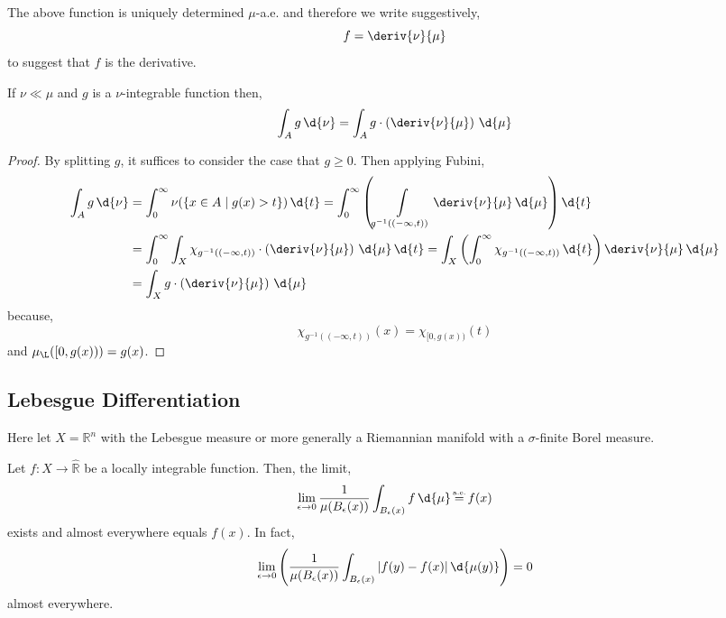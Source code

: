 \documentclass[12pt]{article}
\newcommand{\R}{\mathbb{R}}
\newcommand\eqae{\mathrel{\stackrel{\makebox[0pt]{\mbox{\normalfont\tiny a.e.}}}{=}}}
\begin{document}
\begin{rmk}
The above function is uniquely determined $\mu$-a.e. and therefore we write suggestively,
\[ f = \deriv{\nu}{\mu} \]
to suggest that $f$ is the derivative.
\end{rmk}

\begin{cor}
If $\nu \ll \mu$ and $g$ is a $\nu$-integrable function then,
\[ \int_A g \, \d{\nu} = \int_A g \cdot \left( \deriv{\nu}{\mu} \right) \, \d{\mu} \]
\end{cor}

\begin{proof}
By splitting $g$, it suffices to consider the case that $g \ge 0$. Then applying Fubini,
\begin{align*}
\int_A g \, \d{\nu} & = \int_0^{\infty} \nu(\{ x \in A \mid g(x) > t \}) \, \d{t} = \int_0^{\infty} \left( \int\limits_{g^{-1}((-\infty, t))} \deriv{\nu}{\mu} \, \d{\mu} \right) \d{t} 
\\
& = \int_0^{\infty} \int_X \chi_{g^{-1}((-\infty, t))} \cdot \left( \deriv{\nu}{\mu} \right) \, \d{\mu} \, \d{t} = \int_X \left( \int_0^\infty \chi_{g^{-1}((-\infty, t))} \, \d{t} \right) \deriv{\nu}{\mu} \, \d{\mu}
\\
& = \int_X g  \cdot \left( \deriv{\nu}{\mu} \right) \, \d{\mu} 
\end{align*}
because,
\[ \chi_{g^{-1}((-\infty, t))}(x) = \chi_{[0, g(x))}(t) \]
and $\mu_{\L}([0, g(x))) = g(x)$. 
\end{proof}

\subsection{Lebesgue Differentiation}

\begin{rmk}
Here let $X = \R^n$ with the Lebesgue measure or more generally a Riemannian manifold with a $\sigma$-finite Borel measure.
\end{rmk}

\begin{thm}
Let $f : X \to \hat{\R}$ be a locally integrable function. Then, the limit,
\[ \lim_{\epsilon \to 0} \frac{1}{\mu(B_\epsilon(x))} \int_{B_\epsilon(x)} f \, \d{\mu} \eqae f(x) \]
exists and almost everywhere equals $f(x)$. In fact,
\[ \lim_{\epsilon \to 0} \left( \frac{1}{\mu(B_\epsilon(x))} \int_{B_\epsilon(x)} | f(y) - f(x) | \, \d{\mu(y)} \right) = 0 \]
almost everywhere.
\end{thm}
\end{document}

